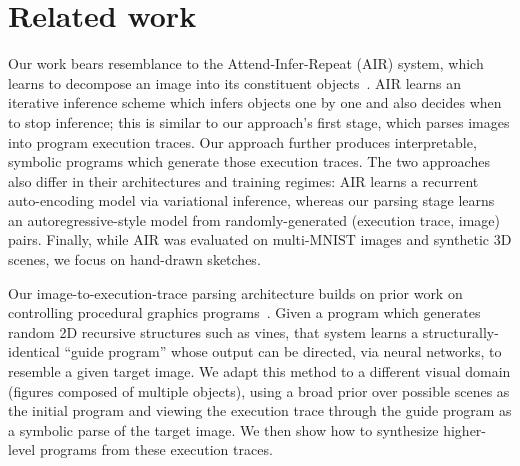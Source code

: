 \documentclass{article}
\newcommand{\remark}[1]{\textcolor{red}{[#1]}}
\begin{document}



\section{Related work}

Our work bears resemblance to the Attend-Infer-Repeat (AIR) system, which learns to decompose an image into its constituent objects~\cite{eslami1603attend}. AIR learns an iterative inference scheme which infers objects one by one and also decides when to stop inference; this is similar to our approach's first stage, which parses images into program execution traces. Our approach further produces interpretable, symbolic programs which generate those execution traces. The two approaches also differ in their architectures and training regimes: AIR learns a recurrent auto-encoding model via variational inference, whereas our parsing stage learns an autoregressive-style model from randomly-generated (execution trace, image) pairs. Finally, while AIR was evaluated on multi-MNIST images and synthetic 3D scenes, we focus on hand-drawn sketches.

Our image-to-execution-trace parsing architecture builds on prior work on controlling procedural graphics programs~\cite{ritchie2016neurally}. Given a program which generates random 2D recursive structures such as vines, that system learns a structurally-identical ``guide program'' whose output can be directed, via neural networks, to resemble a given target image. 
We adapt this method to a different visual domain (figures composed of multiple objects), using a broad prior over possible scenes as the initial program and viewing the execution trace through the guide program as a symbolic parse of the target image.
We then show how to synthesize higher-level programs from these execution traces.
\end{document}
